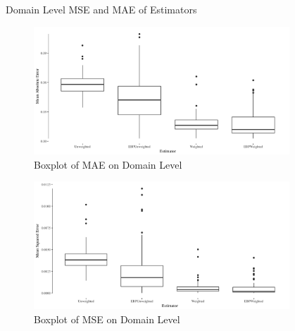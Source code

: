 \documentclass[fleqn,final]{beamer}
\newcommand{\Pheight}{\rule[-5mm]{0cm}{1cm}}
\begin{document}
\begin{frame}
\begin{columns}[t]
\begin{column}{.3\linewidth}
\begin{block}{Domain Level MSE and MAE of Estimators \Pheight}
\begin{center}
	\begin{figure}
		\includegraphics[width=0.9\textwidth]{BPMAE}
		\caption{Boxplot of MAE on Domain Level}
	\end{figure}
		\begin{figure}
		\includegraphics[width=0.9\textwidth]{BPMSE}
		\caption{Boxplot of MSE on Domain Level}
	\end{figure}
\end{center}
\end{block}

\end{column}

%

\begin{column}{.3\linewidth}



\end{column}
\end{columns}
\end{frame}
\end{document}
